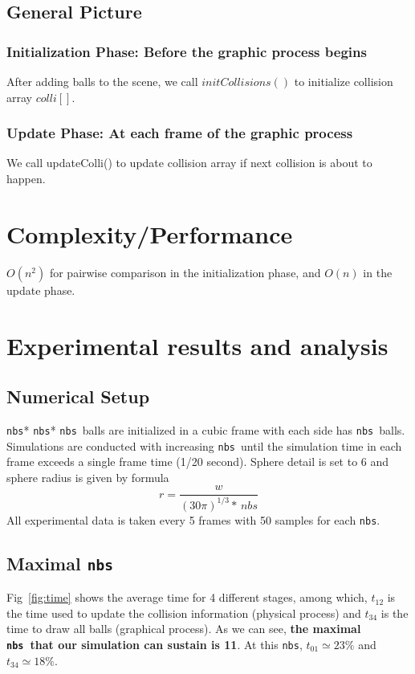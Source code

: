 \documentclass[twoside,11pt]{article}
\newcommand{\nbs}{\texttt{nbs}}
\begin{document}
\subsection{General Picture}

\subsubsection{Initialization Phase: Before the graphic process begins}
After adding balls to the scene, we call $initCollisions()$ to initialize collision array $colli[]$.


\subsubsection{Update Phase: At each frame of the graphic process}
We call updateColli() to update collision array if next collision is about to happen.


\section{Complexity/Performance}
$O(n^2)$ for pairwise comparison in the initialization phase, and $O(n)$ in the update phase.


\section{Experimental results and analysis}

\subsection{Numerical Setup}
\nbs * \nbs * \nbs\ balls are initialized in a cubic 
frame with each side has \nbs\ balls. Simulations are conducted 
with increasing \nbs\ until the simulation time in each frame exceeds
a single frame time (1/20 second). Sphere detail is set to 6 and 
sphere radius is given by formula
\[
  r = \frac{w}{(30\pi)^{1/3} *\, nbs}
\] 
All experimental data is taken every 5 frames with 50 samples
for each \nbs.

\subsection{Maximal \nbs}
Fig~\ref{fig:time} shows the average time for 4 different stages, among
which, $t_{12}$ is the time used to update the collision information 
(physical process) and $t_{34}$ is the time to draw all balls (graphical
process). As we can see, \textbf{the maximal \nbs\ that our simulation can
sustain is 11}. At this \nbs, $t_{01}\simeq 23\%$ and $t_{34}\simeq 18\%$.
\end{document}
